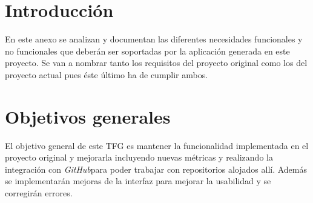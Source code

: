 \label{anex:B}

\section{Introducción}

En este anexo se analizan y documentan las diferentes necesidades funcionales y no funcionales que deberán ser soportadas por la aplicación generada en este proyecto. Se van a nombrar tanto los requisitos del proyecto original\cite{TFGPrevio} como los del proyecto actual pues éste último ha de cumplir ambos.


\section{Objetivos generales}
El objetivo general de este TFG es mantener la funcionalidad implementada en el proyecto original\cite{TFGPrevio} y mejorarla incluyendo nuevas métricas y realizando la integración con \textit{GitHub}para poder trabajar con repositorios alojados allí. Además se implementarán mejoras de la interfaz para mejorar la usabilidad y se corregirán errores.

